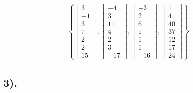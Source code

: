 \documentclass{article}
\begin{document}
\begin{align*}
	\left\{
		\begin{bmatrix} 3 \\ -1 \\ 3 \\ 7 \\ 2 \\ 2 \\ 15 \end{bmatrix},
		\begin{bmatrix} -4 \\ 3 \\ 11 \\ 4 \\ 2 \\ 3 \\ -17 \end{bmatrix},
		\begin{bmatrix} -3 \\ 2 \\ 6 \\ 1 \\ 1 \\ 1 \\ -16 \end{bmatrix},
		\begin{bmatrix} 1 \\ 4 \\ 40 \\ 37 \\ 12 \\ 17 \\ 24 \end{bmatrix}
	\right\}
\end{align*}

\subsection{3).}
\end{document}
